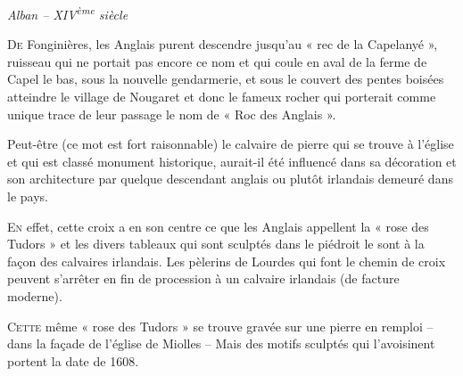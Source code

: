 
\begin{center}
  {\Large\itshape Alban – XIV\textsuperscript{ème} siècle}
\end{center}
\vspace{1.2em}

\noindent
\lettrine{D}{e} Fonginières, les Anglais purent descendre jusqu’au « rec de la Capelanyé », ruisseau qui ne portait pas encore ce nom et qui coule en aval de la ferme de Capel le bas, sous la nouvelle gendarmerie, et sous le couvert des pentes boisées atteindre le village de Nougaret et donc le fameux rocher qui porterait comme unique trace de leur passage le nom de « Roc des Anglais ».

\medskip

Peut-être (ce mot est fort raisonnable) le calvaire de pierre qui se trouve à l’église et qui est classé monument historique, aurait-il été influencé dans sa décoration et son architecture par quelque descendant anglais ou plutôt irlandais demeuré dans le pays.

\medskip

\lettrine{E}{n} effet, cette croix a en son centre ce que les Anglais appellent la « rose des Tudors » et les divers tableaux qui sont sculptés dans le piédroit le sont à la façon des calvaires irlandais. Les pèlerins de Lourdes qui font le chemin de croix peuvent s’arrêter en fin de procession à un calvaire irlandais (de facture moderne).

\medskip

\lettrine{C}{ette} même « rose des Tudors » se trouve gravée sur une pierre en remploi – dans la façade de l’église de Miolles – Mais des motifs sculptés qui l’avoisinent portent la date de 1608.
